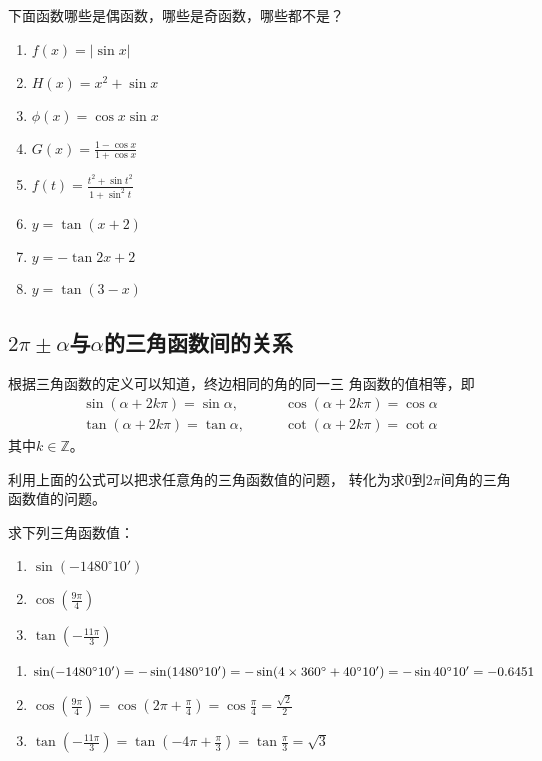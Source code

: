 \begin{ex}
    下面函数哪些是偶函数，哪些是奇函数，哪些都不是？
\begin{multicols}{2}
\begin{enumerate}
    \item $f(x) =|\sin x|$
    \item $H(x)=x^2 +\sin x$
    \item $\phi(x)=\cos x\sin x$
    \item $G(x)=\frac{1-\cos x}{1+\cos x}$
    \item $f(t)=\frac{t^2+\sin t^2}{1+\sin^2 t}$
    \item $y=\tan (x+2)$
    \item $y=-\tan 2x+2$
    \item $y=\tan (3-x)$
\end{enumerate}
\end{multicols}
\end{ex}

\subsection{$2\pi\pm\alpha$与$\alpha$的三角函数间的关系}
根据三角函数的定义可以知道，终边相同的角的同一三
角函数的值相等，即
\begin{equation}
\begin{split}
    \sin(\alpha+2k\pi )=\sin\alpha,&\qquad \cos(\alpha+2k\pi )=\cos\alpha \\
\tan(\alpha+2k\pi ) =\tan\alpha,&\qquad \cot(\alpha+2k\pi )=\cot\alpha
\end{split}
\end{equation}
其中$k\in\mathbb{Z}$。

利用上面的公式可以把求任意角的三角函数值的问题，
转化为求0到$2\pi$间角的三角函数值的问题。

\begin{example}
    求下列三角函数值：
\begin{multicols}{3}
\begin{enumerate}
    \item $\sin(-1480^{\circ}10')$
    \item $\cos\left(\frac{9\pi}{4}\right)$
    \item $\tan\left(-\frac{11\pi}{3}\right)$
\end{enumerate}
\end{multicols}
\end{example}

\begin{solution}
\begin{enumerate}
    \item 
$\sin(-1480^{\circ}10')=-\sin(1480^{\circ}10')=-\sin(4\times 360^{\circ}+40^{\circ}10')=-\sin 40^{\circ}10'=-0.6451$
\item $\cos\left(\frac{9\pi}{4}\right)=\cos\left(2\pi+\frac{\pi}{4}\right)=\cos\frac{\pi}{4}=\frac{\sqrt{2}}{2}$
\item $\tan\left(-\frac{11\pi}{3}\right)=\tan\left(-4\pi+\frac{\pi}{3}\right)=\tan\frac{\pi}{3}=\sqrt{3}$
\end{enumerate}
\end{solution}

